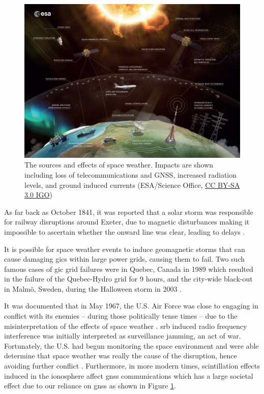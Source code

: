 \begin{figure}[ht!]
	\centering
	\includegraphics[width=\columnwidth]{Space_weather_effects_rescaled.jpg}
	\caption{The sources and effects of space weather. Impacts are shown including loss of telecommunications and GNSS, increased radiation levels, and ground induced currents (ESA/Science Office, \href{http://www.esa.int/spaceinimages/ESA_Multimedia/Copyright_Notice_Images}{CC BY-SA 3.0 IGO})}
	\label{fig:space_weather_impacts}
\end{figure}

\vspace{1em}

As far back as October 1841, it was reported that a solar storm was responsible for railway disruptions around Exeter, due to magnetic disturbances making it impossible to ascertain whether the onward line was clear, leading to delays \citep{nature_observations_1871}. 

It is possible for space weather events to induce geomagnetic storms that can cause damaging \glspl{gic} within large power grids, causing them to fail. Two such famous cases of \gls{gic} grid failures were in Quebec, Canada in 1989 which resulted in the failure of the Quebec-Hydro grid for 9 hours, and the city-wide black-out in Malm{\"o}, Sweden, during the Halloween storm in 2003 \citep{viljanen_european_2011, beggan_ground_2018}.

It was documented that in May 1967, the U.S. Air Force was close to engaging in conflict with its enemies -- during those politically tense times -- due to the misinterpretation of the effects of space weather \citep{knipp_may_2016}. \gls{srb} induced radio frequency interference was initially interpreted as surveillance jamming, an act of war. Fortunately, the U.S. had begun monitoring the space environment and were able determine that space weather was really the cause of the disruption, hence avoiding further conflict \citep{knipp_may_2016}. Furthermore, in more modern times, scintillation effects induced in the ionosphere affect \gls{gnss} communications which has a large societal effect due to our reliance on \gls{gnss} \citep{cannon_extreme_2013} as shown in Figure \ref{fig:space_weather_impacts}.

